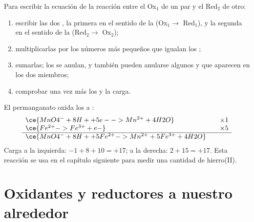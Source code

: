 \begin{method}\label{met:g11:redox:combine}
Para escribir la ecuación de la reacción entre el  Ox$_1$ de un
par y el  Red$_2$ de otro:
\begin{enumerate}
  \item escribir las dos , la primera en el sentido de la
         (Ox$_1 \to$ Red$_1$), y la segunda en el sentido de la
         (Red$_2 \to$ Ox$_2$);
  \item multiplicarlas por los números más pequeños que igualan los
        ;
  \item sumarlas; los  se anulan, y también pueden anularse
        algunos  y  que aparecen en los dos miembros;
  \item comprobar una vez más los  y la carga.
\end{enumerate}
\end{method}

\begin{example}\label{ex:g11:redox:mno4-fe}
El  permanganato oxida los   a :
\[
\begin{array}{l@{\qquad}l}
  \ce{MnO4^- + 8H+ + 5e- -> Mn^{2+} + 4H2O} & \times 1\\
  \ce{Fe^{2+} -> Fe^{3+} + e-} & \times 5\\
  \hline
  \ce{MnO4^- + 8H+ + 5Fe^{2+} -> Mn^{2+} + 5Fe^{3+} + 4H2O} &
\end{array}
\]
Carga a la izquierda: $-1 + 8 + 10 = +17$; a la derecha: $2 + 15 = +17$.
Esta reacción se usa en el capítulo siguiente para medir una cantidad
de hierro(II).
\end{example}

\section{Oxidantes y reductores a nuestro alrededor}

